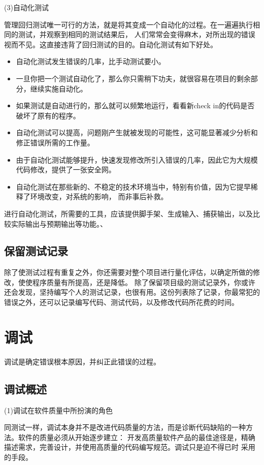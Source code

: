 \documentclass{article}
\begin{document}
\par
(3)自动化测试
\par
管理回归测试唯一可行的方法，就是将其变成一个自动化的过程。在一遍遍执行相同的测试，并观察到相同的测试结果后，
人们常常会变得麻木，对所出现的错误视而不见。这直接违背了回归测试的目的。自动化测试有如下好处。
\begin{itemize}
    \item 自动化测试发生错误的几率，比手动测试要小。
    \item 一旦你把一个测试自动化了，那么你只需稍下功夫，就很容易在项目的剩余部分，继续实施自动化。
    \item 如果测试是自动进行的，那么就可以频繁地运行，看看新check in的代码是否破坏了原有的程序。
    \item 自动化测试可以提高，问题刚产生就被发现的可能性，这可能显著减少分析和修正错误所需的工作量。
    \item 由于自动化测试能够提升，快速发现修改所引入错误的几率，因此它为大规模代码修改，提供了一张安全网。
    \item 自动化测试在那些新的、不稳定的技术环境当中，特别有价值，因为它提早稀释了环境改变，对系统的影响，
    而非事后补救。
\end{itemize}
进行自动化测试，所需要的工具，应该提供脚手架、生成输入、捕获输出，以及比较实际输出与预期输出等功能。、

\subsection{保留测试记录}
除了使测试过程有重复之外，你还需要对整个项目进行量化评估，以确定所做的修改，使使程序质量有所提高，还是降低。
除了保留项目级的测试记录外，你或许还会发现，坚持编写个人的测试记录，也很有用。这份列表除了记录，你最常犯的
错误之外，还可以记录编写代码、测试代码，以及修改代码所花费的时间。


\section{调试}
调试是确定错误根本原因，并纠正此错误的过程。
\subsection{调试概述}
\par
(1)调试在软件质量中所扮演的角色
\par
同测试一样，调试本身并不是改进代码质量的方法，而是诊断代码缺陷的一种方法。软件的质量必须从开始逐步建立：
开发高质量软件产品的最佳途径是，精确描述需求，完善设计，并使用高质量的代码编写规范。调试只是迫不得已时
采用的手段。
\end{document}
